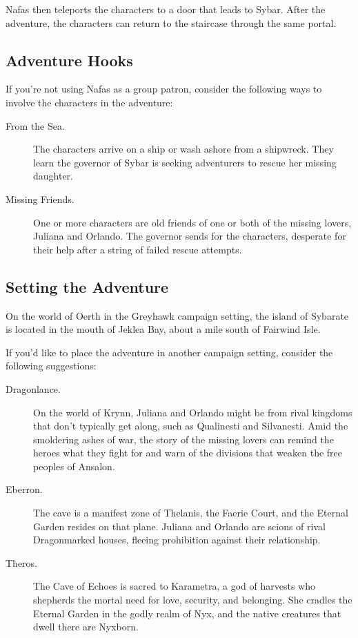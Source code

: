 \documentclass[10pt,a4paper,twoside,bg=print,twocolumn,openany,nodeprecatedcode]{dndbook}
\begin{document}
Nafas then teleports the characters to a door that leads to Sybar. After the adventure, the characters can return to the staircase through the same portal.

\subsection{Adventure Hooks}
If you're not using Nafas as a group patron, consider the following ways to involve the characters in the adventure:


\begin{description}
\item[From the Sea.]
The characters arrive on a ship or wash ashore from a shipwreck. They learn the governor of Sybar is seeking adventurers to rescue her missing daughter.
\item[Missing Friends.]
One or more characters are old friends of one or both of the missing lovers, Juliana and Orlando. The governor sends for the characters, desperate for their help after a string of failed rescue attempts.
\end{description}

\subsection{Setting the Adventure}
On the world of Oerth in the Greyhawk campaign setting, the island of Sybarate is located in the mouth of Jeklea Bay, about a mile south of Fairwind Isle.

If you'd like to place the adventure in another campaign setting, consider the following suggestions:


\begin{description}
\item[Dragonlance.]
On the world of Krynn, Juliana and Orlando might be from rival kingdoms that don't typically get along, such as Qualinesti and Silvanesti. Amid the smoldering ashes of war, the story of the missing lovers can remind the heroes what they fight for and warn of the divisions that weaken the free peoples of Ansalon.
\item[Eberron.]
The cave is a manifest zone of Thelanis, the Faerie Court, and the Eternal Garden resides on that plane. Juliana and Orlando are scions of rival Dragonmarked houses, fleeing prohibition against their relationship.
\item[Theros.]
The Cave of Echoes is sacred to Karametra, a god of harvests who shepherds the mortal need for love, security, and belonging. She cradles the Eternal Garden in the godly realm of Nyx, and the native creatures that dwell there are Nyxborn.
\end{description}
\end{document}
